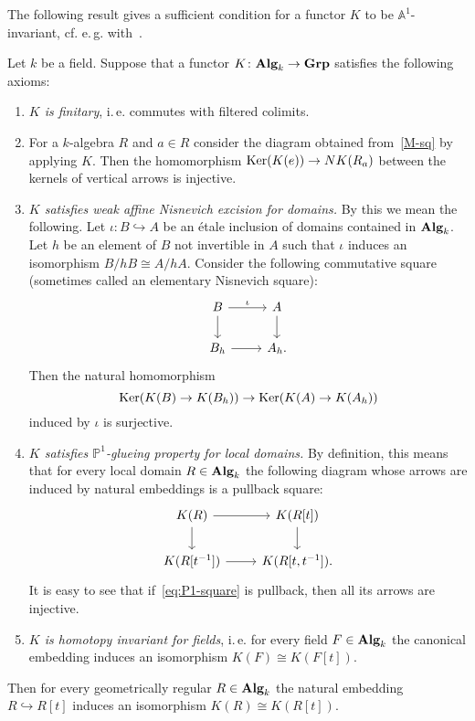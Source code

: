 \documentclass[oneside, 11pt]{amsart} \pdfoutput=1
\begin{document}
The following result gives a sufficient condition for a functor $K$ to be $\mathbb{A}^1$-invariant, cf. e.\,g. with~\cite[Proposition~2.2]{AHW20}.
\begin{theorem} \label{lpb}
 Let $k$ be a field.
 Suppose that a functor $K \colon {\normalfont\textbf{Alg}}_k \to {\normalfont\textbf{Grp}}$ satisfies the following axioms:
 \begin{enumerate}[label=\textnormal{(A\arabic*)}]
  \item \label{CFC} {\it $K$ is finitary}, i.\,e. commutes with filtered colimits.
  \item \label{DP} %
  For a $k$-algebra $R$ and $a \in R$ consider the diagram obtained from~\eqref{M-sq} by applying $K$. Then the homomorphism $\mathop{\mathrm{Ker}}\nolimits(K(e)) \to NK(R_a)$ between the kernels of vertical arrows is injective.
  \item \label{LPP} {\it $K$ satisfies weak affine Nisnevich excision for domains.} By this we mean the following. Let $\iota \colon B \hookrightarrow A$ be an {\'e}tale inclusion of domains contained in ${\normalfont\textbf{Alg}}_k$. Let $h$ be an element of $B$ not invertible in $A$ such that $\iota$ induces an isomorphism $B / hB \cong A / hA$. Consider the following commutative square (sometimes called an elementary Nisnevich square): 
  \[\begin{tikzcd} B \ar{r}{\iota} \ar{d} & A \ar{d}\\ B_h \ar{r} & A_h. \end{tikzcd}\]
  Then the natural homomorphism \[\mathop{\mathrm{Ker}}\nolimits(K(B) \to K(B_h)) \to \mathop{\mathrm{Ker}}\nolimits(K(A) \to K(A_h))\] induced by $\iota$ is surjective.
  \item \label{PGP} {\it $K$ satisfies $\mathbb{P}^1$-glueing property for local domains.}  By definition, this means that for every local domain $R \in {\normalfont\textbf{Alg}}_k$ the following diagram whose arrows are induced by natural embeddings is a pullback square: \begin{equation}\label{eq:P1-square} \begin{tikzcd} K(R) \ar[r] \ar[d] & K(R[t]) \arrow{d} \\ K(R[t^{-1}]) \ar{r} & K(R[t, t^{-1}]). \end{tikzcd} \end{equation}  
  It is easy to see that if~\eqref{eq:P1-square} is pullback, then all its arrows are injective.
  \item \label{HIF} {\it $K$ is homotopy invariant for fields}, i.\,e. for every field $F \in {\normalfont\textbf{Alg}}_k$ the canonical embedding induces an isomorphism $K(F) \cong K(F[t])$.
 \end{enumerate}
 Then for every geometrically regular $R\in {\normalfont\textbf{Alg}}_k$ the natural embedding $R \hookrightarrow R[t]$ induces an isomorphism $K(R)\cong K(R[t]).$
\end{theorem}
\end{document}
